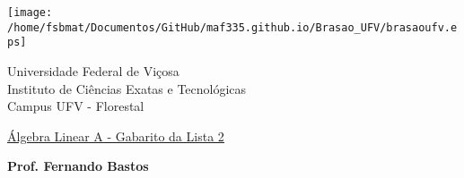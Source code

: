 \documentclass{report}
\begin{document}
\vspace*{-2cm}

\begin{center}
\begin{minipage}[s]{2cm}
\hspace{-1.3cm}\texttt{[image: /home/fsbmat/Documentos/GitHub/maf335.github.io/Brasao\_UFV/brasaoufv.eps]}
\end{minipage}
\begin{minipage}[s]{13cm}
{\begin{center} {\sc \Large Universidade Federal de Vi\c{c}osa}\\
{\sc \large Instituto de Ci\^encias Exatas e Tecnológicas}\\
{\sc \large Campus UFV - Florestal}\\
\end{center}}
\end{minipage}\begin{minipage}[s]{2 cm}
\end{minipage}
\end{center}

\vspace{-0.3cm}



\medskip

\begin{center}

\underline{\underline{{\large{\sc Álgebra Linear A - Gabarito da Lista 2}}}}

\bigskip

{\large {\bf Prof. Fernando Bastos}}
%
\end{center}
\end{document}
